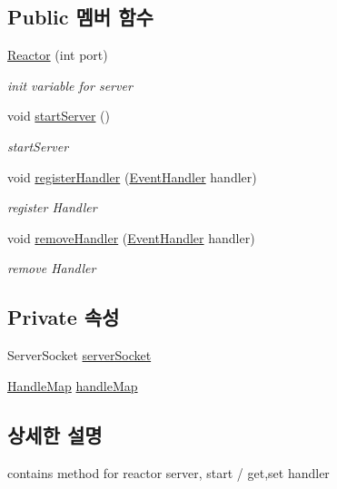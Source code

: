 \subsection*{Public 멤버 함수}
\begin{DoxyCompactItemize}
\item 
\hyperlink{classweek8__server_1_1_reactor_a1aaf09065cb067bad05bb829c7f2eb3e}{Reactor} (int port)
\begin{DoxyCompactList}\small\item\em init variable for server \end{DoxyCompactList}\item 
void \hyperlink{classweek8__server_1_1_reactor_a8dfd45d29257ccfd68f44425f1f4bc1d}{start\-Server} ()
\begin{DoxyCompactList}\small\item\em start\-Server \end{DoxyCompactList}\item 
void \hyperlink{classweek8__server_1_1_reactor_a798e0b09e61056876c94df493b6d9cc9}{register\-Handler} (\hyperlink{interfaceweek8__server_1_1_event_handler}{Event\-Handler} handler)
\begin{DoxyCompactList}\small\item\em register Handler \end{DoxyCompactList}\item 
void \hyperlink{classweek8__server_1_1_reactor_a6fdcf080ba274be3c539f00c7c87cd97}{remove\-Handler} (\hyperlink{interfaceweek8__server_1_1_event_handler}{Event\-Handler} handler)
\begin{DoxyCompactList}\small\item\em remove Handler \end{DoxyCompactList}\end{DoxyCompactItemize}
\subsection*{Private 속성}
\begin{DoxyCompactItemize}
\item 
Server\-Socket \hyperlink{classweek8__server_1_1_reactor_a0ccdb32c43af4ff402db7cdf9991492b}{server\-Socket}
\item 
\hyperlink{classweek8__server_1_1_handle_map}{Handle\-Map} \hyperlink{classweek8__server_1_1_reactor_a8ba93454e7dbe329e3fb503b94b5240e}{handle\-Map}
\end{DoxyCompactItemize}


\subsection{상세한 설명}
contains method for reactor server, start / get,set handler 


